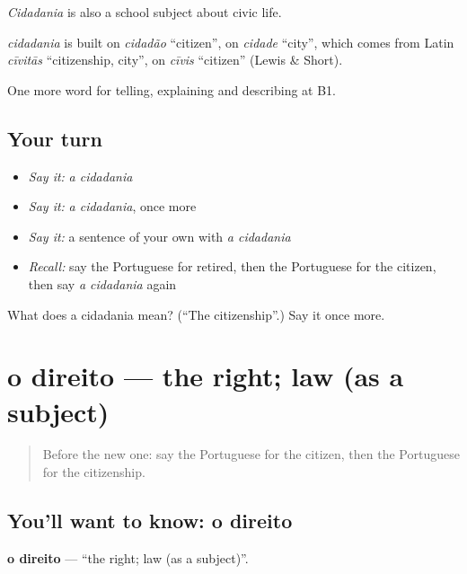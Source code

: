 \emph{Cidadania} is also a school subject about civic life.

\begin{cousinweb}
\emph{cidadania} is built on \emph{cidadão} \textquotedblleft{}citizen\textquotedblright{}, on \emph{cidade} \textquotedblleft{}city\textquotedblright{}, which comes from Latin \emph{cīvitās} \textquotedblleft{}citizenship, city\textquotedblright{}, on \emph{cīvis} \textquotedblleft{}citizen\textquotedblright{} (Lewis \& Short).
\end{cousinweb}

\begin{grammarlens}[title={What you've built}]
One more word for telling, explaining and describing at B1.
\end{grammarlens}

\subsection*{Your turn}
\begin{itemize}
\raggedright
  \item \emph{Say it:} \emph{a cidadania}
  \item \emph{Say it:} \emph{a cidadania}, once more
  \item \emph{Say it:} a sentence of your own with \emph{a cidadania}
  \item \emph{Recall:} say the Portuguese for retired, then the Portuguese for the citizen, then say \emph{a cidadania} again
\end{itemize}

\begin{tcolorbox}[breakable,colback=teal!4,colframe=teal!35!black,title={Before you move on}]
What does a cidadania mean? (\textquotedblleft{}The citizenship\textquotedblright{}.) Say it once more.
\end{tcolorbox}
\section[o direito]{o direito — the right; law (as a subject)}

\label{lesson:PT-C363-direito}



\begin{quote}
Before the new one: say the Portuguese for the citizen, then the Portuguese for the citizenship.
\end{quote}

\subsection*{You'll want to know: o direito}
\textbf{o direito} — \textquotedblleft{}the right; law (as a subject)\textquotedblright{}.

